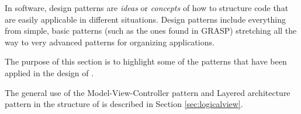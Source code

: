 In software, design patterns are \emph{ideas} or \emph{concepts} of how to structure code that are easily applicable
in different situations. Design patterns include everything from simple, basic patterns (such as the ones found in
GRASP) stretching all the way to very advanced patterns for organizing applications.

The purpose of this section is to highlight some of the patterns that have been applied in the design of \SOP{}.

The general use of the Model-View-Controller pattern and Layered architecture pattern in the structure of \SOP{} 
is described in Section \ref{sec:logicalview}.








